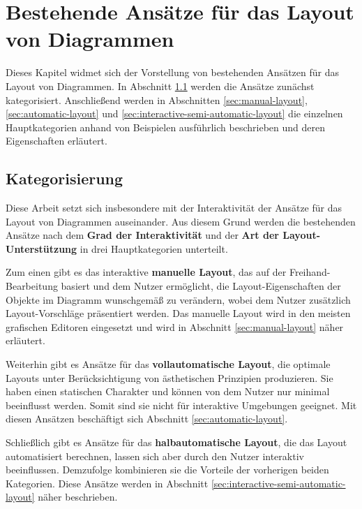 
\chapter{Bestehende Ansätze für das Layout von Diagrammen}
\label{chapter:existing-approaches}

Dieses Kapitel widmet sich der Vorstellung von bestehenden Ansätzen für das Layout von Diagrammen. In Abschnitt \ref{sec:categorization} werden die Ansätze zunächst kategorisiert. Anschließend werden in Abschnitten \ref{sec:manual-layout}, \ref{sec:automatic-layout} und \ref{sec:interactive-semi-automatic-layout} die einzelnen Hauptkategorien anhand von Beispielen ausführlich beschrieben und deren Eigenschaften erläutert.

\section{Kategorisierung}
\label{sec:categorization}

Diese Arbeit setzt sich insbesondere mit der Interaktivität der Ansätze für das Layout von Diagrammen auseinander. Aus diesem Grund werden die bestehenden Ansätze nach dem \textbf{Grad der Interaktivität} und der \textbf{Art der Layout-Unterstützung} in drei Hauptkategorien unterteilt.

Zum einen gibt es das interaktive \textbf{manuelle Layout}, das auf der Freihand-Bearbeitung basiert und dem Nutzer ermöglicht, die Layout-Eigenschaften der Objekte im Diagramm wunschgemäß zu verändern, wobei dem Nutzer zusätzlich Layout-Vorschläge präsentiert werden. Das manuelle Layout wird in den meisten grafischen Editoren eingesetzt und wird in Abschnitt \ref{sec:manual-layout} näher erläutert.

Weiterhin gibt es Ansätze für das \textbf{vollautomatische Layout}, die optimale Layouts unter Berücksichtigung von ästhetischen Prinzipien produzieren. Sie haben einen statischen Charakter und können von dem Nutzer nur minimal beeinflusst werden. Somit sind sie nicht für interaktive Umgebungen geeignet. Mit diesen Ansätzen beschäftigt sich Abschnitt \ref{sec:automatic-layout}.

Schließlich gibt es Ansätze für das \textbf{halbautomatische Layout}, die das Layout automatisiert berechnen, lassen sich aber durch den Nutzer interaktiv beeinflussen. Demzufolge kombinieren sie die Vorteile der vorherigen beiden Kategorien. Diese Ansätze werden in Abschnitt \ref{sec:interactive-semi-automatic-layout} näher beschrieben.

